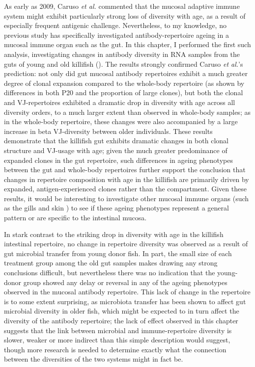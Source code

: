 As early as 2009, Caruso \textit{et al.} \parencite{caruso2009immunosenescence} commented that the mucosal adaptive immune system might exhibit particularly strong loss of diversity with age, as a result of especially frequent antigenic challenge. Nevertheless, to my knowledge, no previous study has specifically investigated antibody-repertoire ageing in a mucosal immune organ such as the gut. In this chapter, I performed the first such analysis, investigating changes in antibody diversity in RNA samples from the guts of young and old killifish (). The results strongly confirmed Caruso \textit{et al.}'s prediction: not only did gut mucosal antibody repertoires exhibit a much greater degree of clonal expansion compared to the whole-body repertoire (as shown by differences in both P20 and the proportion of large clones), but both the clonal and VJ-repertoires exhibited a dramatic drop in diversity with age across all diversity orders, to a much larger extent than observed in whole-body samples; as in the whole-body repertoire, these changes were also accompanied by a large increase in beta VJ-diversity between older individuals. These results demonstrate that the killifish gut exhibits dramatic changes in both clonal structure and VJ-usage with age; given the much greater predominance of expanded clones in the gut repertoire, such differences in ageing phenotypes between the gut and whole-body repertoires further support the conclusion that changes in repertoire composition with age in the killifish are primarily driven by expanded, antigen-experienced clones rather than the \naive compartment. Given these results, it would be interesting to investigate other mucosal immune organs (such as the gills and skin \parencite{xu2013igtskin}) to see if these ageing phenotypes represent a general pattern or are specific to the intestinal mucosa.

In stark contrast to the striking drop in diversity with age in the killifish intestinal repertoire, no change in repertoire diversity was observed as a result of gut microbial transfer from young donor fish. In part, the small size of each treatment group among the old gut samples makes drawing any strong conclusions difficult, but nevertheless there was no indication that the young-donor group showed any delay or reversal in any of the ageing phenotypes observed in the mucosal antibody repertoire. This lack of change in the repertoire is to some extent surprising, as microbiota transfer has been shown to affect gut microbial diversity in older fish, which might be expected to in turn affect the diversity of the antibody repertoire; the lack of effect observed in this chapter suggests that the link between microbial and immune-repertoire diversity is slower, weaker or more indirect than this simple description would suggest, though more research is needed to determine exactly what the connection between the diversities of the two systems might in fact be. 

